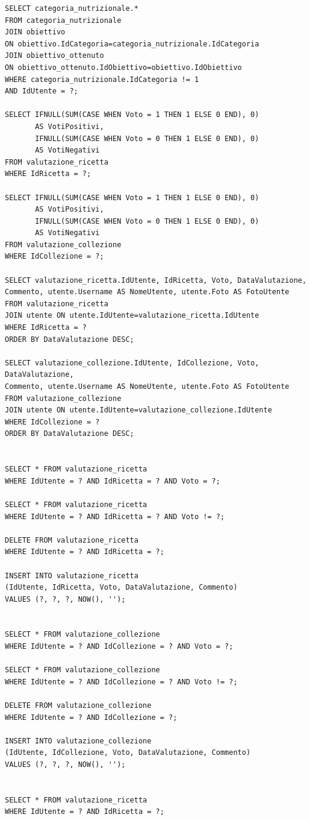 ﻿\documentclass[a4paper,12pt]{report}
\begin{document}
\begin{verbatim}
SELECT categoria_nutrizionale.*
FROM categoria_nutrizionale
JOIN obiettivo
ON obiettivo.IdCategoria=categoria_nutrizionale.IdCategoria
JOIN obiettivo_ottenuto
ON obiettivo_ottenuto.IdObiettivo=obiettivo.IdObiettivo
WHERE categoria_nutrizionale.IdCategoria != 1
AND IdUtente = ?;

SELECT IFNULL(SUM(CASE WHEN Voto = 1 THEN 1 ELSE 0 END), 0)
       AS VotiPositivi,
       IFNULL(SUM(CASE WHEN Voto = 0 THEN 1 ELSE 0 END), 0)
       AS VotiNegativi
FROM valutazione_ricetta
WHERE IdRicetta = ?;

SELECT IFNULL(SUM(CASE WHEN Voto = 1 THEN 1 ELSE 0 END), 0)
       AS VotiPositivi,
       IFNULL(SUM(CASE WHEN Voto = 0 THEN 1 ELSE 0 END), 0)
       AS VotiNegativi
FROM valutazione_collezione
WHERE IdCollezione = ?;

SELECT valutazione_ricetta.IdUtente, IdRicetta, Voto, DataValutazione,
Commento, utente.Username AS NomeUtente, utente.Foto AS FotoUtente
FROM valutazione_ricetta
JOIN utente ON utente.IdUtente=valutazione_ricetta.IdUtente
WHERE IdRicetta = ?
ORDER BY DataValutazione DESC;

SELECT valutazione_collezione.IdUtente, IdCollezione, Voto, DataValutazione, 
Commento, utente.Username AS NomeUtente, utente.Foto AS FotoUtente
FROM valutazione_collezione
JOIN utente ON utente.IdUtente=valutazione_collezione.IdUtente
WHERE IdCollezione = ?
ORDER BY DataValutazione DESC;


SELECT * FROM valutazione_ricetta
WHERE IdUtente = ? AND IdRicetta = ? AND Voto = ?;

SELECT * FROM valutazione_ricetta
WHERE IdUtente = ? AND IdRicetta = ? AND Voto != ?;

DELETE FROM valutazione_ricetta
WHERE IdUtente = ? AND IdRicetta = ?;

INSERT INTO valutazione_ricetta
(IdUtente, IdRicetta, Voto, DataValutazione, Commento)
VALUES (?, ?, ?, NOW(), '');


SELECT * FROM valutazione_collezione
WHERE IdUtente = ? AND IdCollezione = ? AND Voto = ?;

SELECT * FROM valutazione_collezione
WHERE IdUtente = ? AND IdCollezione = ? AND Voto != ?;

DELETE FROM valutazione_collezione
WHERE IdUtente = ? AND IdCollezione = ?;

INSERT INTO valutazione_collezione
(IdUtente, IdCollezione, Voto, DataValutazione, Commento)
VALUES (?, ?, ?, NOW(), '');


SELECT * FROM valutazione_ricetta
WHERE IdUtente = ? AND IdRicetta = ?;


\end{verbatim}
\end{document}
